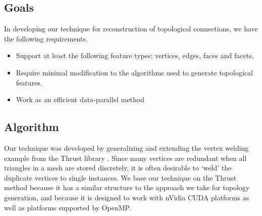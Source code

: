 \documentclass[10pt,journal,cspaper,compsoc]{IEEEtran}
\begin{document}
\subsection{Goals}
In developing our technique for reconstruction of topological connections, we have the
following requirements.
\begin{itemize}
	\item{Support at least the following feature types: vertices, edges, faces and facets.}

	\item{Require minimal modification to the algorithms used to generate topological features.}

	\item{Work as an efficient data-parallel method}
 
\end{itemize}

\subsection{Algorithm}
Our technique was developed by generalizing and extending the vertex welding example from the Thrust library \cite{Bell2012}.
Since many vertices are redundant when all triangles in a mesh are stored discretely, it is often desirable to
`weld' the duplicate vertices to single instances. We base our technique on the Thrust method because it has a similar
structure to the approach we take for topology generation, and because it is designed to work with nVidia CUDA platforms as well as platforms supported by OpenMP. 

\end{document}
